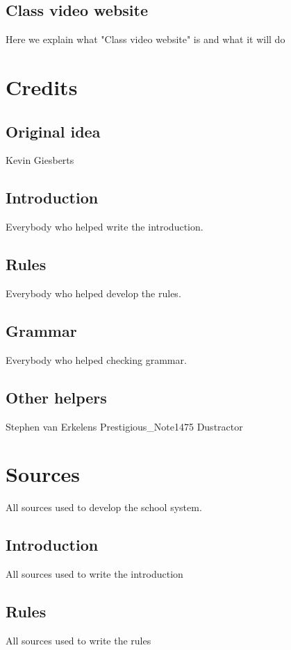 \documentclass[titlepage]{article}
\begin{document}
\subsection{Class video website}
Here we explain what "Class video website" is and what it will do

\newpage
\section{Credits}
\subsection{Original idea}
Kevin Giesberts
\subsection{Introduction}
Everybody who helped write the introduction.
\subsection{Rules}
Everybody who helped develop the rules.
\subsection{Grammar}
Everybody who helped checking grammar.
\subsection{Other helpers}
Stephen van Erkelens
\newline
Prestigious\_Note1475
\newline
Dustractor

\newpage
\section{Sources}
All sources used to develop the school system.
\subsection{Introduction}
All sources used to write the introduction
\subsection{Rules}
All sources used to write the rules
\end{document}
